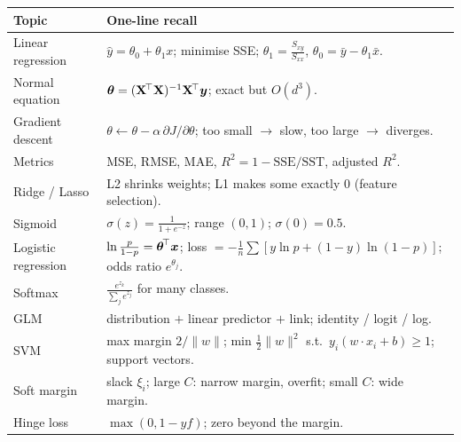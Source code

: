 \begin{revision}
\begin{center}\small
\begin{tabular}{@{}p{3.6cm}p{9.6cm}@{}}
\toprule
\textbf{Topic} & \textbf{One-line recall}\\
\midrule
Linear regression & $\hat y=\theta_0+\theta_1x$; minimise SSE; $\theta_1=\frac{S_{xy}}{S_{xx}}$, $\theta_0=\bar y-\theta_1\bar x$.\\
Normal equation & $\boldsymbol{\theta}=(\mathbf X^{\!\top}\mathbf X)^{-1}\mathbf X^{\!\top}\boldsymbol{y}$; exact but $O(d^3)$.\\
Gradient descent & $\theta\leftarrow\theta-\alpha\,\partial J/\partial\theta$; too small $\to$ slow, too large $\to$ diverges.\\
Metrics & MSE, RMSE, MAE, $R^2=1-\text{SSE}/\text{SST}$, adjusted $R^2$.\\
Ridge / Lasso & L2 shrinks weights; L1 makes some exactly $0$ (feature selection).\\
Sigmoid & $\sigma(z)=\frac{1}{1+e^{-z}}$; range $(0,1)$; $\sigma(0)=0.5$.\\
Logistic regression & $\ln\frac{p}{1-p}=\boldsymbol{\theta}^{\!\top}\boldsymbol{x}$; loss $=-\frac1n\sum[y\ln p+(1-y)\ln(1-p)]$; odds ratio $e^{\theta_j}$.\\
Softmax & $\frac{e^{z_k}}{\sum_je^{z_j}}$ for many classes.\\
GLM & distribution $+$ linear predictor $+$ link; identity / logit / log.\\
SVM & max margin $2/\|w\|$; min $\frac12\|w\|^2$ s.t.\ $y_i(w\cdot x_i+b)\ge1$; support vectors.\\
Soft margin & slack $\xi_i$; large $C$: narrow margin, overfit; small $C$: wide margin.\\
Hinge loss & $\max(0,1-yf)$; zero beyond the margin.\\
\bottomrule
\end{tabular}
\end{center}
\end{revision}
